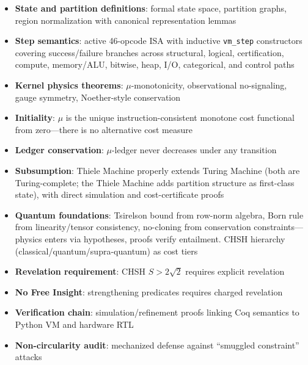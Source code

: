 \begin{itemize}
    \item \textbf{State and partition definitions}: formal state space, partition graphs, region normalization with canonical representation lemmas

    \item \textbf{Step semantics}: active 46-opcode ISA with inductive \texttt{vm\_step} constructors covering success/failure branches across structural, logical, certification, compute, memory/ALU, bitwise, heap, I/O, categorical, and control paths

    \item \textbf{Kernel physics theorems}: $\mu$-monotonicity, observational no-signaling, gauge symmetry, Noether-style conservation

    \item \textbf{Initiality}: $\mu$ is the unique instruction-consistent monotone cost functional from zero---there is no alternative cost measure

    \item \textbf{Ledger conservation}: $\mu$-ledger never decreases under any transition

    \item \textbf{Subsumption}: Thiele Machine properly extends Turing Machine (both are Turing-complete; the Thiele Machine adds partition structure as first-class state), with direct simulation and cost-certificate proofs

    \item \textbf{Quantum foundations}: Tsirelson bound from row-norm algebra, Born rule from linearity/tensor consistency, no-cloning from conservation constraints---physics enters via hypotheses, proofs verify entailment. CHSH hierarchy (classical/quantum/supra-quantum) as cost tiers

    \item \textbf{Revelation requirement}: CHSH $S > 2\sqrt{2}$ requires explicit revelation

    \item \textbf{No Free Insight}: strengthening predicates requires charged revelation

    \item \textbf{Verification chain}: simulation/refinement proofs linking Coq semantics to Python VM and hardware RTL

    \item \textbf{Non-circularity audit}: mechanized defense against ``smuggled constraint'' attacks
\end{itemize}

